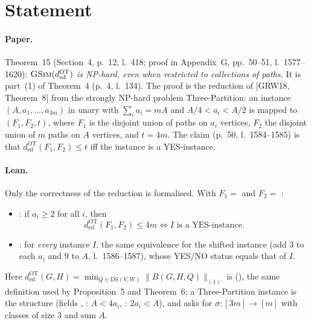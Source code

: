 

\paperversion

\section{Statement}

\paragraph{Paper.} Theorem~15 (Section~4, p.~12, l.~418; proof in Appendix~G, pp.~50--51, l.~1577--1620):
\emph{$\textsc{GSim}(d^{\mathrm{OT}}_{\mathrm{ed}})$ is NP-hard, even when restricted to collections of paths.}
It is part~(1) of Theorem~4 (p.~4, l.~134). The proof is the reduction of [GRW18, Theorem~8] from the strongly
NP-hard problem Three-Partition: an instance $(A,a_1,\dots,a_{3m})$ in unary with $\sum_i a_i=mA$ and
$A/4<a_i<A/2$ is mapped to $(F_1,F_2,t)$, where $F_1$ is the disjoint union of paths on $a_i$ vertices,
$F_2$ the disjoint union of $m$ paths on $A$ vertices, and $t=4m$. The claim (p.~50, l.~1584--1585) is that
$d^{\mathrm{OT}}_{\mathrm{ed}}(F_1,F_2)\le t$ iff the instance is a YES-instance.

\paragraph{Lean.} Only the correctness of the reduction is formalised. With
$F_1=$  and $F_2=$ :
\begin{itemize}
\item {}: if $a_i\ge2$ for all $i$, then
  \[ d^{\mathrm{OT}}_{\mathrm{ed}}(F_1,F_2)\le 4m \iff I \text{ is a YES-instance.} \]
\item {}: for \emph{every} instance $I$, the same
  equivalence for the shifted instance (add $3$ to each $a_i$ and $9$ to $A$, l.~1586--1587), whose
  YES/NO status equals that of $I$.
\end{itemize}
Here $d^{\mathrm{OT}}_{\mathrm{ed}}(G,H)=\min_{Q\in\mathrm{DS}(V,W)}\|B(G,H,Q)\|_{(1)}$ is 
(), the same definition used by Proposition~5 and Theorem~6; a
Three-Partition instance is the structure  (fields ,
: $A<4a_i$, : $2a_i<A$), and  asks for
$\sigma\colon[3m]\to[m]$ with classes of size $3$ and sum $A$.

